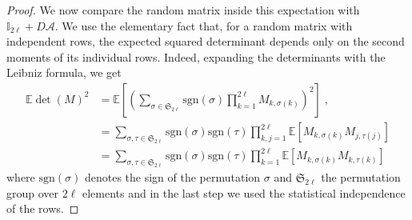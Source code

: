 \documentclass[prx,twocolumn,superscriptaddress,aps,10pt, frontmatterverbose, reprint,footinbib,longbibliography=true]{revtex4-2}
\begin{document}
\begin{proof}
We now compare the random matrix inside this expectation with
$\mathbb{I}_{2\ell}+D\mathcal{A}$. We use the elementary fact that, for
a random matrix with independent rows, the expected squared
determinant depends only on the second moments of its individual
rows. Indeed, expanding the determinants with the Leibniz formula, we get
\begin{equation}
\begin{split}
    \mathbb{E}\det(M)^2
&=
\mathbb{E}\!\left[\left(\sum_{\sigma\in\mathfrak{S}_{2\ell}}
\mathrm{sgn}(\sigma)
\prod_{k=1}^{2\ell}
M_{k,\sigma(k)}
\right)^2\right]\;,\\
&=\sum_{\sigma,\tau\in \mathfrak{S}_{2\ell}} \mathrm{sgn}(\sigma) \mathrm{sgn}(\tau)
\prod_{k,j=1}^{2\ell}
\mathbb{E}\!\left[M_{k,\sigma(k)}M_{j,\tau(j)}\right]\\
&=\sum_{\sigma,\tau\in \mathfrak{S}_{2\ell}} \mathrm{sgn}(\sigma) \mathrm{sgn}(\tau)
\prod_{k=1}^{2\ell}
\mathbb{E}\!\left[M_{k,\sigma(k)}M_{k,\tau(k)}\right]
\end{split}
\end{equation}
where $\mathrm{sgn}(\sigma)$ denotes the sign of the permutation $\sigma$ and $\mathfrak{S}_{2\ell}$ the permutation group over $2\ell$ elements and in the last step we used the statistical independence of the rows.


\end{proof}
\end{document}
